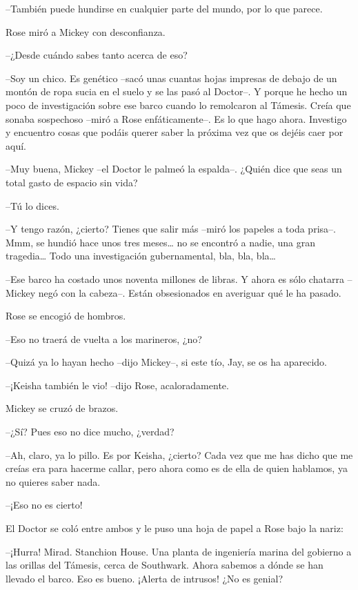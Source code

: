 {--También puede hundirse en cualquier parte del mundo, por lo que
parece.}

{Rose miró a Mickey con desconfianza.}

{--¿Desde cuándo sabes tanto acerca de eso?}

{--Soy un chico. Es genético --sacó unas cuantas hojas impresas de
 debajo de un montón de ropa sucia en el suelo y se las pasó al Doctor--.
 Y porque he hecho un poco de investigación sobre ese barco cuando lo
 remolcaron al Támesis. Creía que sonaba sospechoso --miró a Rose
 enfáticamente--. Es lo que hago ahora. Investigo y encuentro cosas que
podáis querer saber la próxima vez que os dejéis caer por aquí.}

{--Muy buena, Mickey --el Doctor le palmeó la espalda--. ¿Quién dice que
seas un total gasto de espacio sin vida?}

{--Tú lo dices.}

{--Y tengo razón, ¿cierto? Tienes que salir más --miró los papeles a
 toda prisa--. Mmm, se hundió hace unos tres meses\ldots{} no se encontró
 a nadie, una gran tragedia\ldots{} Todo una investigación gubernamental,
 bla, bla, bla\ldots{}}

{--Ese barco ha costado unos noventa millones de libras. Y ahora es sólo
 chatarra --Mickey negó con la cabeza--. Están obsesionados en averiguar
qué le ha pasado.}

{Rose se encogió de hombros.}

{--Eso no traerá de vuelta a los marineros, ¿no?}

{--Quizá ya lo hayan hecho --dijo Mickey--, si este tío, Jay, se os ha
aparecido.}

{--¡Keisha también le vio! --dijo Rose, acaloradamente.}

{Mickey se cruzó de brazos.}

{--¿Sí? Pues eso no dice mucho, ¿verdad?}

{--Ah, claro, ya lo pillo. Es por Keisha, ¿cierto? Cada vez que me has
 dicho que me creías era para hacerme callar, pero ahora como es de ella
de quien hablamos, ya no quieres saber nada.}

{--¡Eso no es cierto!}

{El Doctor se coló entre ambos y le puso una hoja de papel a Rose bajo
la nariz:}

{--¡Hurra! Mirad. Stanchion House. Una planta de ingeniería marina del
 gobierno a las orillas del Támesis, cerca de Southwark. Ahora sabemos a
 dónde se han llevado el barco. Eso es bueno. ¡Alerta de intrusos! ¿No es
genial?}


